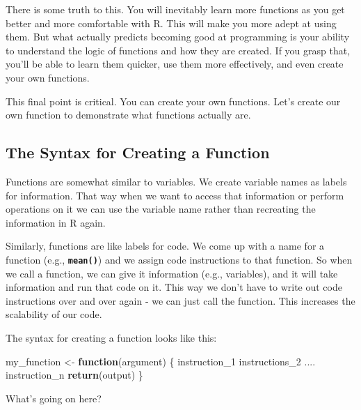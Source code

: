 \documentclass[
]{book}
\newenvironment{Shaded}{\begin{snugshade}}{\end{snugshade}}
\newcommand{\ControlFlowTok}[1]{\textcolor[rgb]{0.13,0.29,0.53}{\textbf{#1}}}
\newcommand{\FunctionTok}[1]{\textcolor[rgb]{0.13,0.29,0.53}{\textbf{#1}}}
\newcommand{\NormalTok}[1]{#1}
\newcommand{\OtherTok}[1]{\textcolor[rgb]{0.56,0.35,0.01}{#1}}
\begin{document}
There is some truth to this. You will inevitably learn more functions as you get better and more comfortable with R. This will make you more adept at using them. But what actually predicts becoming good at programming is your ability to understand the logic of functions and how they are created. If you grasp that, you'll be able to learn them quicker, use them more effectively, and even create your own functions.

This final point is critical. You can create your own functions. Let's create our own function to demonstrate what functions actually are.

\hypertarget{the-syntax-for-creating-a-function}{%
\subsection{The Syntax for Creating a Function}\label{the-syntax-for-creating-a-function}}

Functions are somewhat similar to variables. We create variable names as labels for information. That way when we want to access that information or perform operations on it we can use the variable name rather than recreating the information in R again.

Similarly, functions are like labels for code. We come up with a name for a function (e.g., \textbf{\texttt{mean()}}) and we assign code instructions to that function. So when we call a function, we can give it information (e.g., variables), and it will take information and run that code on it. This way we don't have to write out code instructions over and over again - we can just call the function. This increases the scalability of our code.

The syntax for creating a function looks like this:

\begin{Shaded}
\begin{Highlighting}[]
\NormalTok{my\_function }\OtherTok{\textless{}{-}} \ControlFlowTok{function}\NormalTok{(argument) \{}
\NormalTok{  instruction\_1}
\NormalTok{  instructions\_2}
\NormalTok{  ....}
\NormalTok{  instruction\_n}
  \FunctionTok{return}\NormalTok{(output)}
\NormalTok{\}}
\end{Highlighting}
\end{Shaded}

What's going on here?
\end{document}
